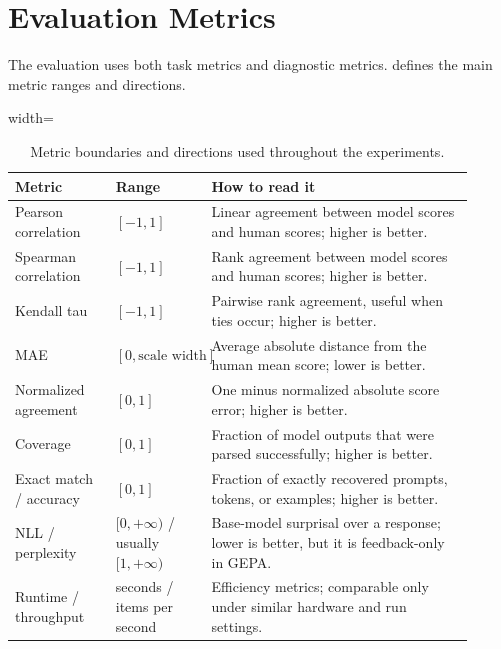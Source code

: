 \documentclass[12pt,a4paper,twoside,openright]{book}
\begin{document}
\section{Evaluation Metrics}
\label{sec:setup-metrics}

The evaluation uses both task metrics and diagnostic metrics.
 defines the main metric ranges and directions.

\begin{table}[!htb]
    \centering
    \scriptsize
    \begin{adjustbox}{width=\textwidth}
    \begin{tabular}{p{0.20\linewidth} p{0.19\linewidth} p{0.52\linewidth}}
        \toprule
        \textbf{Metric} & \textbf{Range} & \textbf{How to read it} \\
        \midrule
        Pearson correlation &
        $[-1,1]$ &
        Linear agreement between model scores and human scores; higher is better. \\
        Spearman correlation &
        $[-1,1]$ &
        Rank agreement between model scores and human scores; higher is better. \\
        Kendall tau &
        $[-1,1]$ &
        Pairwise rank agreement, useful when ties occur; higher is better. \\
        MAE &
        $[0, \text{scale width}]$ &
        Average absolute distance from the human mean score; lower is better. \\
        Normalized agreement &
        $[0,1]$ &
        One minus normalized absolute score error; higher is better. \\
        Coverage &
        $[0,1]$ &
        Fraction of model outputs that were parsed successfully; higher is better. \\
        Exact match / accuracy &
        $[0,1]$ &
        Fraction of exactly recovered prompts, tokens, or examples; higher is better. \\
        NLL / perplexity &
        $[0,+\infty)$ / usually $[1,+\infty)$ &
        Base-model surprisal over a response; lower is better, but it is feedback-only in GEPA. \\
        Runtime / throughput &
        seconds / items per second &
        Efficiency metrics; comparable only under similar hardware and run settings. \\
        \bottomrule
    \end{tabular}
    \end{adjustbox}
    \caption{Metric boundaries and directions used throughout the experiments.}
    \label{tab:metric-boundaries}
\end{table}
\end{document}
